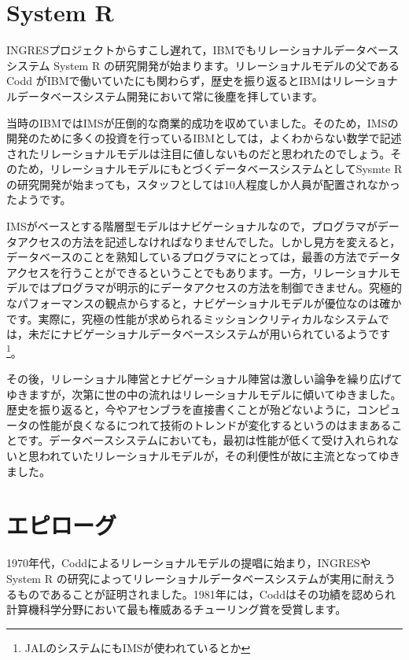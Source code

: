 \section{System R}


INGRESプロジェクトからすこし遅れて，IBMでもリレーショナルデータベースシステム System R の研究開発が始まります。リレーショナルモデルの父であるCodd がIBMで働いていたにも関わらず，歴史を振り返るとIBMはリレーショナルデータベースシステム開発において常に後塵を拝しています。


当時のIBMではIMSが圧倒的な商業的成功を収めていました。そのため，IMSの開発のために多くの投資を行っているIBMとしては，よくわからない数学で記述されたリレーショナルモデルは注目に値しないものだと思われたのでしょう。そのため，リレーショナルモデルにもとづくデータベースシステムとしてSysmte Rの研究開発が始まっても，スタッフとしては10人程度しか人員が配置されなかったようです。


IMSがベースとする階層型モデルはナビゲーショナルなので，プログラマがデータアクセスの方法を記述しなければなりませんでした。しかし見方を変えると，データベースのことを熟知しているプログラマにとっては，最善の方法でデータアクセスを行うことができるということでもあります。一方，リレーショナルモデルではプログラマが明示的にデータアクセスの方法を制御できません。究極的なパフォーマンスの観点からすると，ナビゲーショナルモデルが優位なのは確かです。実際に，究極の性能が求められるミッションクリティカルなシステムでは，未だにナビゲーショナルデータベースシステムが用いられているようです\footnote{JALのシステムにもIMSが使われているとか}。


その後，リレーショナル陣営とナビゲーショナル陣営は激しい論争を繰り広げてゆきますが，次第に世の中の流れはリレーショナルモデルに傾いてゆきました。歴史を振り返ると，今やアセンブラを直接書くことが殆どないように，コンピュータの性能が良くなるにつれて技術のトレンドが変化するというのはままあることです。データベースシステムにおいても，最初は性能が低くて受け入れられないと思われていたリレーショナルモデルが，その利便性が故に主流となってゆきました。


\section{エピローグ}


1970年代，Coddによるリレーショナルモデルの提唱に始まり，INGRESやSystem R の研究によってリレーショナルデータベースシステムが実用に耐えうるものであることが証明されました。1981年には，Coddはその功績を認められ計算機科学分野において最も権威あるチューリング賞を受賞します。


